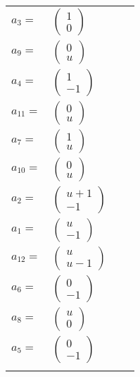 \documentclass[1p]{elsarticle_modified}
\theoremstyle{definition}
\begin{document}
\begin{tabular}{m{7pt} m{180pt} m{7pt} m{180pt} }
\flushright $a_{3}=$&$\begin{pmatrix}1\\0\end{pmatrix}$ \\
\flushright $a_{9}=$&$\begin{pmatrix}0\\u\end{pmatrix}$ \\
\flushright $a_{4}=$&$\begin{pmatrix}1\\-1\end{pmatrix}$ \\
\flushright $a_{11}=$&$\begin{pmatrix}0\\u\end{pmatrix}$ \\
\flushright $a_{7}=$&$\begin{pmatrix}1\\u\end{pmatrix}$ \\
\flushright $a_{10}=$&$\begin{pmatrix}0\\u\end{pmatrix}$ \\
\flushright $a_{2}=$&$\begin{pmatrix}u+1\\-1\end{pmatrix}$ \\
\flushright $a_{1}=$&$\begin{pmatrix}u\\-1\end{pmatrix}$ \\
\flushright $a_{12}=$&$\begin{pmatrix}u\\u-1\end{pmatrix}$ \\
\flushright $a_{6}=$&$\begin{pmatrix}0\\-1\end{pmatrix}$ \\
\flushright $a_{8}=$&$\begin{pmatrix}u\\0\end{pmatrix}$ \\
\flushright $a_{5}=$&$\begin{pmatrix}0\\-1\end{pmatrix}$\\&\end{tabular}
\end{document}
